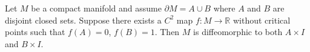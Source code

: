 Let $M$ be a compact manifold and assume $\partial M = A \cup B$ where $A$ and $B$ are disjoint closed sets. Suppose there exists a $C^2$ map $f: M \to \mathbb{R}$ without critical points such that $f(A) = 0$, $f(B) = 1$. Then $M$ is diffeomorphic to both $A \times I$ and $B \times I$.
